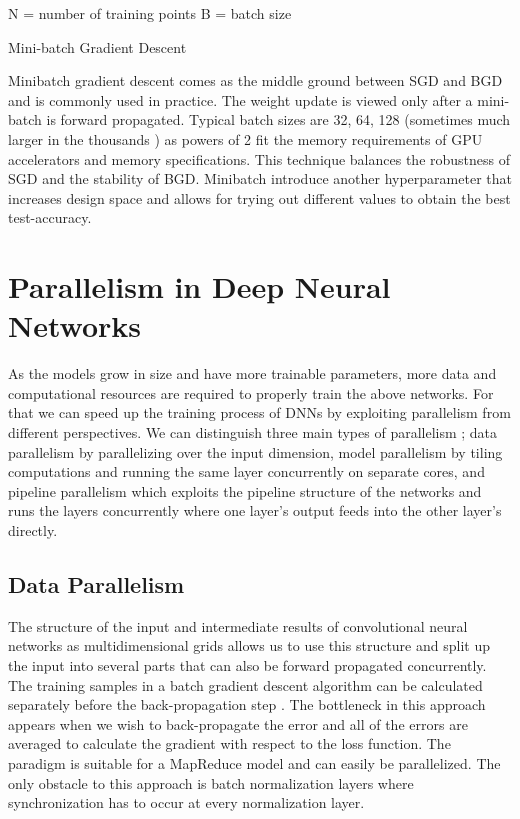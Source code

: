 \begin{minipage}{.7\linewidth}
\begin{algorithm}[H]
N = number of training points\;
B = batch size\;
 \caption{Mini-batch Gradient Descent}
\end{algorithm}
\end{minipage}

Minibatch gradient descent comes as the middle ground between SGD and BGD and is commonly used in practice. The weight update is viewed only after a mini-batch is forward propagated. Typical batch sizes are 32, 64, 128 (sometimes much larger in the thousands )  as powers of 2 fit the memory requirements of GPU accelerators and memory specifications. This technique balances the robustness of SGD and the stability of BGD. Minibatch introduce another hyperparameter that increases design space and allows for trying out different values to obtain the best test-accuracy.


\section{Parallelism in Deep Neural Networks}
As the models grow in size and have more trainable parameters, more data and computational resources are required to properly train the above networks. For that we can speed up the training process of DNNs by exploiting parallelism from different perspectives. We can distinguish three main types of parallelism \cite{ddl}; data parallelism by parallelizing over the input dimension, model parallelism by tiling computations and running the same layer concurrently on separate cores, and pipeline parallelism which exploits the pipeline structure of the networks and runs the layers concurrently where one layer’s output feeds into the other layer's directly. 

\subsection{Data Parallelism}
The structure of the input and intermediate results of convolutional neural networks as multidimensional grids allows us to use this structure and split up the input into several parts that can also be forward propagated concurrently. The training samples in a batch gradient descent algorithm can be calculated separately before the back-propagation step \cite{ddl}. The bottleneck in this approach appears when we wish to back-propagate the error and all of the errors are averaged to calculate the gradient with respect to the loss function. The paradigm is suitable for a MapReduce model and can easily be parallelized. The only obstacle to this approach is batch normalization layers where synchronization has to occur at every normalization layer\cite{deepfpga}. 

